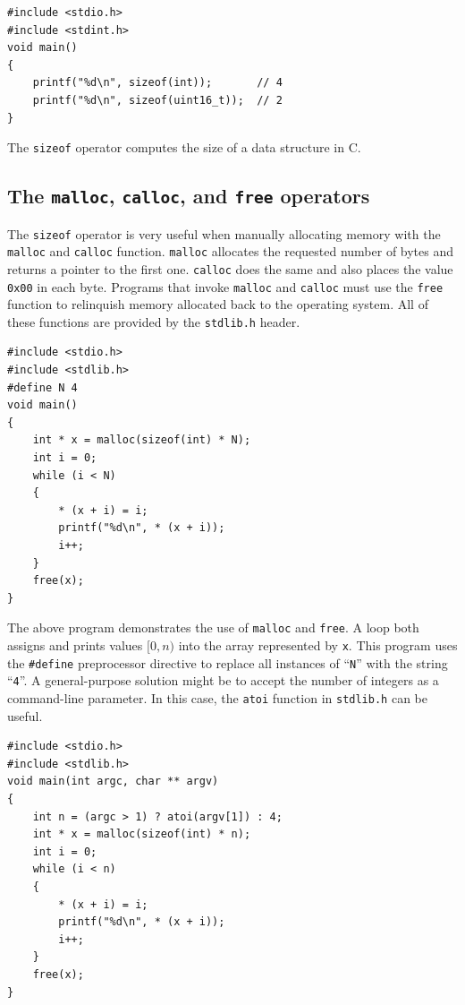 \documentclass{book}
\begin{document}
\begin{lstlisting}[caption={todo}, captionpos=b, mathescape, xleftmargin=.25in, xrightmargin=.25in]
#include <stdio.h>
#include <stdint.h>
void main()
{
    printf("%d\n", sizeof(int));       // 4
    printf("%d\n", sizeof(uint16_t));  // 2
}
\end{lstlisting}

The \texttt{sizeof} operator computes the size of a data structure in C.

\subsection{The \texttt{malloc}, \texttt{calloc}, and \texttt{free} operators}

The \texttt{sizeof} operator is very useful when manually allocating memory with the \texttt{malloc} and \texttt{calloc} function. \texttt{malloc} allocates the requested number of bytes and returns a pointer to the first one. \texttt{calloc} does the same and also places the value \texttt{0x00} in each byte. Programs that invoke \texttt{malloc} and \texttt{calloc} must use the \texttt{free} function to relinquish memory allocated back to the operating system. All of these functions are provided by the \texttt{stdlib.h} header.

\begin{lstlisting}[caption={todo}, captionpos=b, mathescape, xleftmargin=.25in, xrightmargin=.25in]
#include <stdio.h>
#include <stdlib.h>
#define N 4
void main()
{
    int * x = malloc(sizeof(int) * N);
    int i = 0;
    while (i < N)
    {
        * (x + i) = i;
        printf("%d\n", * (x + i));
        i++;
    }
    free(x);
}
\end{lstlisting}

The above program demonstrates the use of \texttt{malloc} and \texttt{free}. A loop both assigns and prints values $[0,n)$ into the array represented by \texttt{x}. This program uses the \texttt{\#define} preprocessor directive to replace all instances of ``\texttt{N}'' with the string ``\texttt{4}''. A general-purpose solution might be to accept the number of integers as a command-line parameter. In this case, the \texttt{atoi} function in \texttt{stdlib.h} can be useful.

\begin{lstlisting}[caption={todo}, captionpos=b, mathescape, xleftmargin=.25in, xrightmargin=.25in]
#include <stdio.h>
#include <stdlib.h>
void main(int argc, char ** argv)
{
    int n = (argc > 1) ? atoi(argv[1]) : 4;
    int * x = malloc(sizeof(int) * n);
    int i = 0;
    while (i < n)
    {
        * (x + i) = i;
        printf("%d\n", * (x + i));
        i++;
    }
    free(x);
}
\end{lstlisting}
\end{document}
